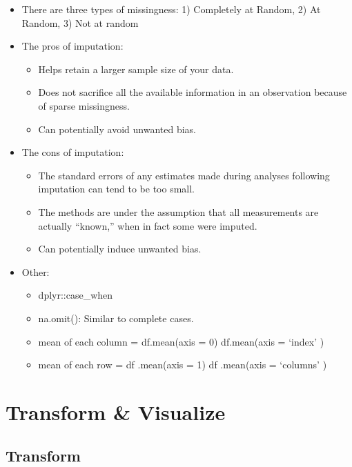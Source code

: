 \documentclass[]{book}
\theoremstyle{definition}
\theoremstyle{definition}
\theoremstyle{definition}
\theoremstyle{remark}
\begin{document}
\begin{itemize}
\item
  There are three types of missingness: 1) Completely at Random, 2) At
  Random, 3) Not at random
\item
  The pros of imputation:

  \begin{itemize}
  \item
    Helps retain a larger sample size of your data.
  \item
    Does not sacrifice all the available information in an observation
    because of sparse missingness.
  \item
    Can potentially avoid unwanted bias.
  \end{itemize}
\item
  The cons of imputation:

  \begin{itemize}
  \item
    The standard errors of any estimates made during analyses following
    imputation can tend to be too small.
  \item
    The methods are under the assumption that all measurements are
    actually ``known,'' when in fact some were imputed.
  \item
    Can potentially induce unwanted bias.
  \end{itemize}
\item
  Other:

  \begin{itemize}
  \item
    dplyr::case\_when
  \item
    na.omit(): Similar to complete cases.
  \item
    mean of each column = df.mean(axis = 0) \textbar{}\textbar{}
    df.mean(axis = `index' )
  \item
    mean of each row = df .mean(axis = 1) \textbar{}\textbar{} df
    .mean(axis = `columns' )
  \end{itemize}
\end{itemize}

\chapter{Transform \& Visualize}\label{transform-visualize}

\section{Transform}\label{transform-1}
\end{document}

